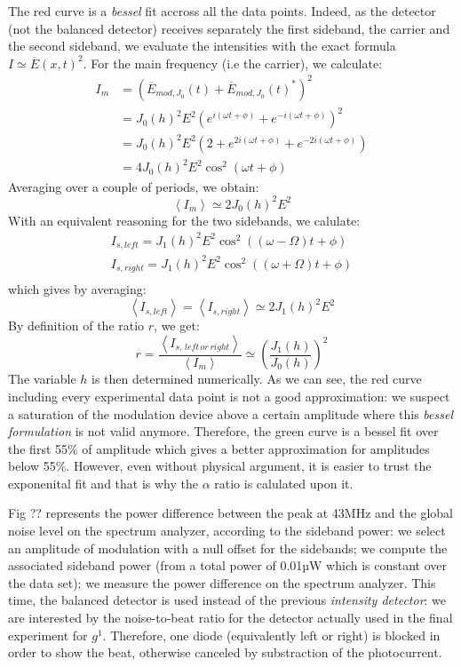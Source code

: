 \documentclass[12pt]{report}
\begin{document}
The red curve is a \textit{bessel} fit accross all the data points. Indeed, as the detector (not the balanced detector) receives separately the first sideband, the carrier and the second sideband, we evaluate the intensities with the exact formula $I \simeq \overline{E}(x,t)^2$. For the main frequency (i.e the carrier), we calculate:
\begin{align}
I_m &= \left( \overline{E}_{mod,J_0}(t) + \overline{E}_{mod,J_0}(t)^* \right)^2\\
&= J_0(h)^2E^2\left(e^{i(\omega t + \phi)} + e^{-i(\omega t + \phi)}\right)^2\\
&= J_0(h)^2E^2\left( 2 + e^{2i(\omega t + \phi)} + e^{-2i(\omega t + \phi)}\right)\\
&= 4J_0(h)^2E^2\cos^2(\omega t + \phi)
\end{align}
Averaging over a couple of periods, we obtain:
\begin{equation}
\left\langle I_m \right\rangle \simeq 2J_0(h)^2E^2
\end{equation}
With an equivalent reasoning for the two sidebands, we calulate:
\begin{align}
I_{s,left} = J_1(h)^2E^2\cos^2(( \omega - \Omega ) t + \phi )\\
I_{s,right} = J_1(h)^2E^2\cos^2(( \omega + \Omega ) t + \phi )\\
\end{align}
which gives by averaging:
\begin{equation}
\left\langle I_{s,left} \right\rangle = \left\langle I_{s,right} \right\rangle \simeq 2J_1(h)^2E^2
\end{equation}
By definition of the ratio $r$, we get:
\begin{equation}
r = \frac{\left\langle I_{s,\, left \, or \, right} \right\rangle}{\left\langle I_m \right\rangle} \simeq \left( \frac{J_1(h)}{J_0(h)} \right)^2
\end{equation}
The variable $h$ is then determined numerically. As we can see, the red curve including every experimental data point is not a good approximation: we suspect a saturation of the modulation device above a certain amplitude where this \textit{bessel formulation} is not valid anymore. Therefore, the green curve is a bessel fit over the first 55\% of amplitude which gives a better approximation for amplitudes below 55\%. However, even without physical argument, it is easier to trust the exponenital fit and that is why the $\alpha$ ratio is calulated upon it.

Fig ?? represents the power difference between the peak at 43MHz and the global noise level on the spectrum analyzer, according to the sideband power: we select an amplitude of modulation with a null offset for the sidebands; we compute the associated sideband power (from a total power of 0.01µW which is constant over the data set); we measure the power difference on the spectrum analyzer. This time, the balanced detector is used instead of the previous \textit{intensity detector}: we are interested by the noise-to-beat ratio for the detector actually used in the final experiment for $g^1$. Therefore, one diode (equivalently left or right) is blocked in order to show the beat, otherwise canceled by substraction of the photocurrent.
\end{document}

